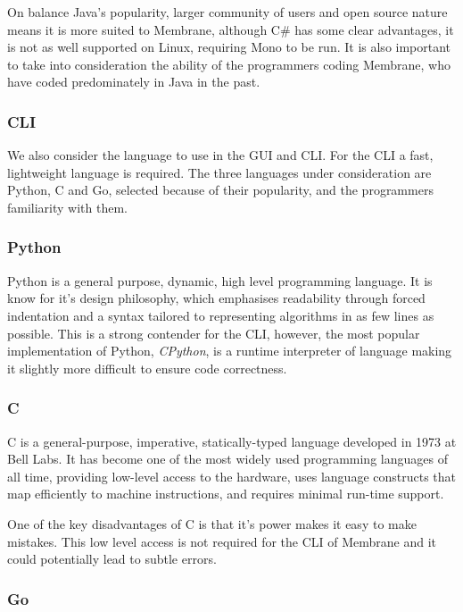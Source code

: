 \documentclass[11pt, a4paper, twocolumn, twoside]{report}
\begin{document}
On balance Java's popularity, larger community of users and open source nature means it is more suited to Membrane, although C\# has some clear advantages, it is not as well supported on Linux, requiring Mono to be run. It is also important to take into consideration the ability of the programmers coding Membrane, who have coded predominately in Java in the past.

\subsubsection{CLI}

We also consider the language to use in the GUI and CLI. For the CLI a fast, lightweight language is required. The three languages under consideration are Python, C and Go, selected because of their popularity, and the programmers familiarity with them.

\subsubsection{Python}

Python is a general purpose, dynamic, high level programming language. It is know for it's design philosophy, which emphasises readability through forced indentation and a syntax tailored to representing algorithms in as few lines as possible. This is a strong contender for the CLI, however, the most popular implementation of Python, \emph{CPython}, is a runtime interpreter of language making it slightly more difficult to ensure code correctness.

\subsubsection{C}

C is a general-purpose, imperative, statically-typed language developed in 1973 at Bell Labs. \citep{banahan1988c} It has become one of the most widely used programming languages of all time, providing low-level access to the hardware, uses language constructs that map efficiently to machine instructions, and requires minimal run-time support.

One of the key disadvantages of C is that it's power makes it easy to make mistakes. This low level access is not required for the CLI of Membrane and it could potentially lead to subtle errors.

\subsubsection{Go}
\end{document}
